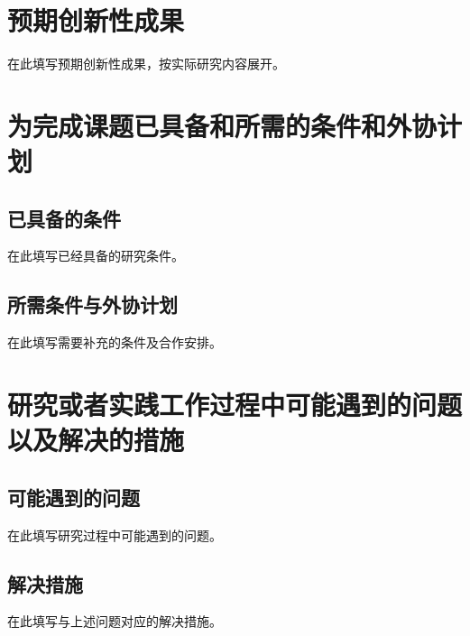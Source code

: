 \documentclass[UTF8,fontset=none,scheme=plain,zihao=-4]{ctexart}
\begin{document}
\section{预期创新性成果}
在此填写预期创新性成果，按实际研究内容展开。

\section{为完成课题已具备和所需的条件和外协计划}
\subsection{已具备的条件}
在此填写已经具备的研究条件。

\subsection{所需条件与外协计划}
在此填写需要补充的条件及合作安排。

\section{研究或者实践工作过程中可能遇到的问题以及解决的措施}
\subsection{可能遇到的问题}
在此填写研究过程中可能遇到的问题。

\subsection{解决措施}
在此填写与上述问题对应的解决措施。



\end{document}
